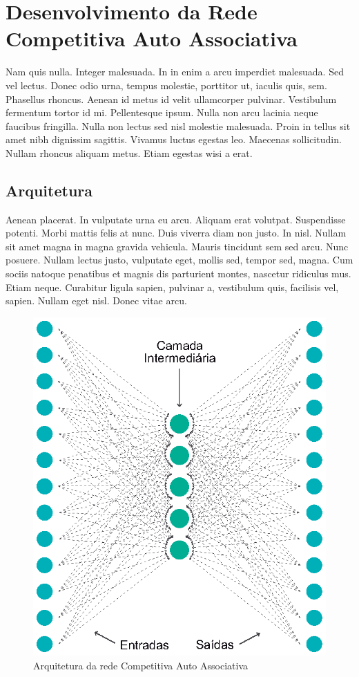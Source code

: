 \section{Desenvolvimento da Rede Competitiva Auto Associativa}

Nam quis nulla. Integer malesuada. In in enim a arcu imperdiet malesuada. Sed vel lectus. Donec odio urna, tempus molestie, porttitor ut, iaculis quis, sem. Phasellus rhoncus. Aenean id metus id velit ullamcorper pulvinar. Vestibulum fermentum tortor id mi. Pellentesque ipsum. Nulla non arcu lacinia neque faucibus fringilla. Nulla non lectus sed nisl molestie malesuada. Proin in tellus sit amet nibh dignissim sagittis. Vivamus luctus egestas leo. Maecenas sollicitudin. Nullam rhoncus aliquam metus. Etiam egestas wisi a erat.

\subsection{Arquitetura}

Aenean placerat. In vulputate urna eu arcu. Aliquam erat volutpat. Suspendisse potenti. Morbi mattis felis at nunc. Duis viverra diam non justo. In nisl. Nullam sit amet magna in magna gravida vehicula. Mauris tincidunt sem sed arcu. Nunc posuere. Nullam lectus justo, vulputate eget, mollis sed, tempor sed, magna. Cum sociis natoque penatibus et magnis dis parturient montes, nascetur ridiculus mus. Etiam neque. Curabitur ligula sapien, pulvinar a, vestibulum quis, facilisis vel, sapien. Nullam eget nisl. Donec vitae arcu.

\begin{figure}[h!]

\centering %
\includegraphics{04-Figuras/Arquitetura-AutoAssociativa}

\caption{Arquitetura da rede Competitiva Auto Associativa}

\label{figura:arquiteturaAuto}

\end{figure}